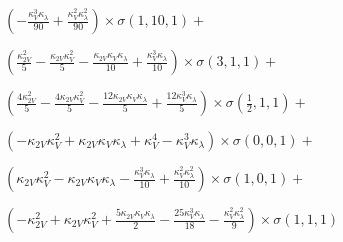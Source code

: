 $\left(- \frac{\kappa_{V}^{3} \kappa_{\lambda}}{90} + \frac{\kappa_{V}^{2} \kappa_{\lambda}^{2}}{90}\right) \times \sigma{\left(1,10,1 \right)} +$

$ \left(\frac{\kappa_{2V}^{2}}{5} - \frac{\kappa_{2V} \kappa_{V}^{2}}{5} - \frac{\kappa_{2V} \kappa_{V} \kappa_{\lambda}}{10} + \frac{\kappa_{V}^{3} \kappa_{\lambda}}{10}\right) \times \sigma{\left(3,1,1 \right)} +$

$ \left(\frac{4 \kappa_{2V}^{2}}{5} - \frac{4 \kappa_{2V} \kappa_{V}^{2}}{5} - \frac{12 \kappa_{2V} \kappa_{V} \kappa_{\lambda}}{5} + \frac{12 \kappa_{V}^{3} \kappa_{\lambda}}{5}\right) \times \sigma{\left(\frac{1}{2},1,1 \right)} +$

$ \left(- \kappa_{2V} \kappa_{V}^{2} + \kappa_{2V} \kappa_{V} \kappa_{\lambda} + \kappa_{V}^{4} - \kappa_{V}^{3} \kappa_{\lambda}\right) \times \sigma{\left(0,0,1 \right)} +$

$ \left(\kappa_{2V} \kappa_{V}^{2} - \kappa_{2V} \kappa_{V} \kappa_{\lambda} - \frac{\kappa_{V}^{3} \kappa_{\lambda}}{10} + \frac{\kappa_{V}^{2} \kappa_{\lambda}^{2}}{10}\right) \times \sigma{\left(1,0,1 \right)} +$

$ \left(- \kappa_{2V}^{2} + \kappa_{2V} \kappa_{V}^{2} + \frac{5 \kappa_{2V} \kappa_{V} \kappa_{\lambda}}{2} - \frac{25 \kappa_{V}^{3} \kappa_{\lambda}}{18} - \frac{\kappa_{V}^{2} \kappa_{\lambda}^{2}}{9}\right) \times \sigma{\left(1,1,1 \right)}$
